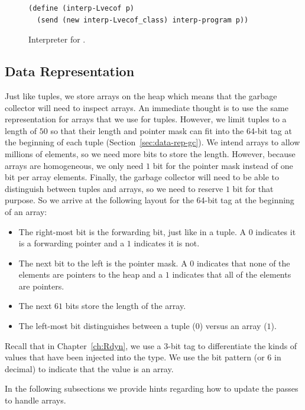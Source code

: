 \documentclass[7x10]{TimesAPriori_MIT}%
\begin{document}
{\begin{figure}[tbp]
\begin{lstlisting}[basicstyle=\ttfamily\footnotesize]
(define (interp-Lvecof p)
  (send (new interp-Lvecof_class) interp-program p))
\end{lstlisting}
\caption{Interpreter for \LangArray{}.}
\label{fig:interp-Lvecof}
\end{figure}


\subsection{Data Representation}
\label{sec:array-rep}

Just like tuples, we store arrays on the heap which means that the
garbage collector will need to inspect arrays. An immediate thought is
to use the same representation for arrays that we use for tuples.
However, we limit tuples to a length of $50$ so that their length and
pointer mask can fit into the 64-bit tag at the beginning of each
tuple (Section~\ref{sec:data-rep-gc}). We intend arrays to allow
millions of elements, so we need more bits to store the length.
However, because arrays are homogeneous, we only need $1$ bit for the
pointer mask instead of one bit per array elements.  Finally, the
garbage collector will need to be able to distinguish between tuples
and arrays, so we need to reserve $1$ bit for that purpose.  So we
arrive at the following layout for the 64-bit tag at the beginning of
an array:
\begin{itemize}
\item The right-most bit is the forwarding bit, just like in a tuple.
  A $0$ indicates it is a forwarding pointer and a $1$ indicates
  it is not.
  
\item The next bit to the left is the pointer mask. A $0$ indicates
  that none of the elements are pointers to the heap and a $1$
  indicates that all of the elements are pointers.

\item The next $61$ bits store the length of the array.

\item The left-most bit distinguishes between a tuple ($0$) versus an
  array ($1$).
\end{itemize}


Recall that in Chapter~\ref{ch:Rdyn}, we use a $3$-bit tag to
differentiate the kinds of values that have been injected into the
 type. We use the bit pattern  (or $6$ in decimal)
to indicate that the value is an array.

In the following subsections we provide hints regarding how to update
the passes to handle arrays.


}
\end{document}
